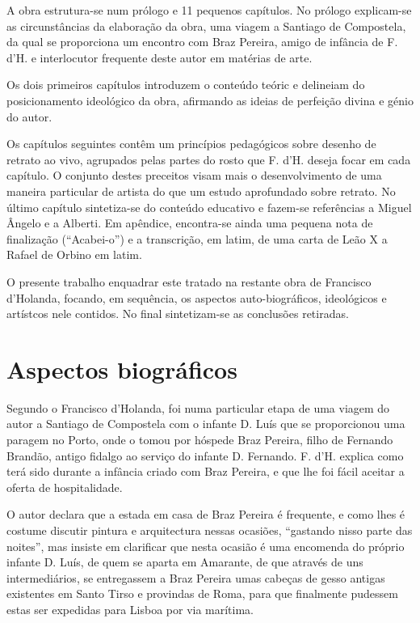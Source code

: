 \documentclass{article}
\begin{document}
A obra estrutura-se num prólogo e 11 pequenos capítulos. No prólogo
explicam-se as circunstâncias da elaboração da obra, uma viagem a
Santiago de Compostela, da qual se proporciona um encontro com Braz
Pereira, amigo de infância de F. d'H. e interlocutor frequente deste
autor em matérias de arte.

Os dois primeiros capítulos introduzem o conteúdo teóric e delineiam
do posicionamento ideológico da obra, afirmando as ideias de perfeição
divina e génio do autor.

Os capítulos seguintes contêm um princípios pedagógicos sobre desenho
de retrato ao vivo, agrupados pelas partes do rosto que F. d'H. deseja
focar em cada capítulo. O conjunto destes preceitos visam mais o
desenvolvimento de uma maneira particular de artista do que um estudo
aprofundado sobre retrato. No último capítulo sintetiza-se do conteúdo
educativo e fazem-se referências a Miguel Ângelo e a Alberti. Em
apêndice, encontra-se ainda uma pequena nota de finalização
(``Acabei-o'') e a transcrição, em latim, de uma carta de Leão X a Rafael de
Orbino em latim.

O presente trabalho enquadrar este tratado na restante obra de
Francisco d'Holanda, focando, em sequência, os aspectos
auto-biográficos, ideológicos e artístcos nele contidos. No final
sintetizam-se as conclusões retiradas.

\section{Aspectos biográficos}

Segundo o Francisco d'Holanda, foi numa particular etapa de uma viagem
do autor a Santiago de Compostela com o infante D. Luís que se
proporcionou uma paragem no Porto, onde o tomou por hóspede Braz
Pereira, filho de Fernando Brandão, antigo fidalgo ao serviço do
infante D. Fernando. F. d'H. explica como terá sido durante a infância
criado com Braz Pereira, e que lhe foi fácil aceitar a oferta de
hospitalidade.

O autor declara que a estada em casa de Braz Pereira é frequente, e
como lhes é costume discutir pintura e arquitectura nessas ocasiões,
``gastando nisso parte das noites'', mas insiste em clarificar que
nesta ocasião é uma encomenda do próprio infante D. Luís, de quem se
aparta em Amarante, de que através de uns intermediários, se
entregassem a Braz Pereira umas cabeças de gesso antigas existentes em
Santo Tirso e provindas de Roma, para que finalmente pudessem estas
ser expedidas para Lisboa por via marítima.
\end{document}

